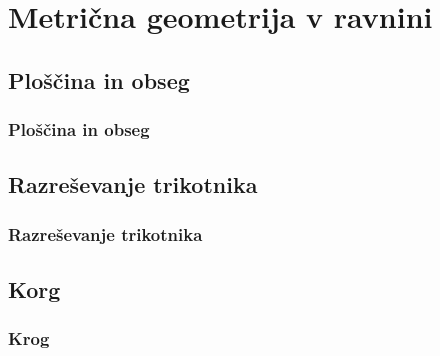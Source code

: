 \section{Metrična geometrija v ravnini}

\begin{frame}
    \sectionpage
\end{frame}

\begin{frame}
\end{frame}

    \subsection{Ploščina in obseg}

        \begin{frame}
            \frametitle{Ploščina in obseg}
        \end{frame}

    \subsection{Razreševanje trikotnika}

        \begin{frame}
            \frametitle{Razreševanje trikotnika}
        \end{frame}

    \subsection{Korg}

        \begin{frame}
            \frametitle{Krog}
        \end{frame}
